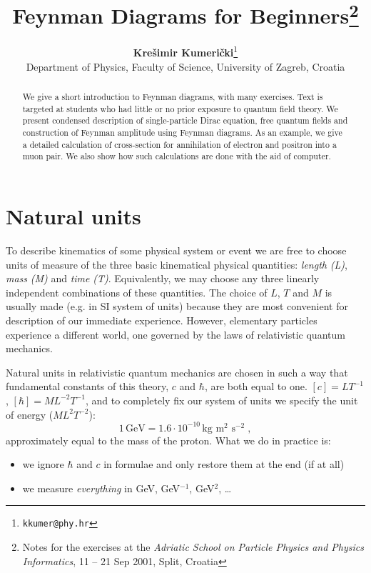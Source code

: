 \documentclass[twoside,a4paper,12pt]{article}
\theoremstyle{break}
\theoremstyle{plain}
\begin{document}

\title{ \Huge \textbf{Feynman Diagrams for Beginners}\footnote{%
Notes for the exercises at the
\emph{Adriatic School on Particle Physics and Physics Informatics},
11 -- 21 Sep 2001, Split, Croatia}
}

\author{\textbf{Krešimir Kumerički}\footnote{\scriptsize\texttt{kkumer@phy.hr}}\\[2ex]
\small Department of Physics, Faculty of Science, University of Zagreb, Croatia}
\date{}
\maketitle

\begin{abstract}                              
  We give a short introduction to Feynman diagrams, with many exercises.
  Text is targeted at students who had little or no prior exposure to
  quantum field theory. We present condensed description of single-particle 
  Dirac equation,
  free quantum fields and construction of Feynman amplitude using
  Feynman diagrams. As an example, we give a detailed calculation of
  cross-section for annihilation of electron and positron into a muon pair.
  We also show how such calculations are done with the aid of computer.
\end{abstract}      

\tableofcontents

\section{Natural units}

To describe kinematics of some physical system or event we are free to choose
units of measure of the three basic kinematical physical
quantities: \emph{length} \emph{(L)}, \emph{mass} \emph{(M)} and
\emph{time} \emph{(T)}. Equivalently, we may choose any three linearly
independent combinations of these quantities.
The choice of $L$, $T$ and $M$ is usually made (e.g. in SI system of
units) because they are most convenient for description of our immediate
experience. However, elementary particles experience a different world,
one governed by the laws of relativistic quantum mechanics.

Natural units in relativistic quantum mechanics are chosen in such a
way that
fundamental constants of this theory, $c$ and $\hbar$, are both equal to one.
$[c]=LT^{-1}$, $[\hbar]=ML^{-2}T^{-1}$, and to completely fix our system
of units we specify the unit of energy ($ML^2T^{-2}$):
\[
  1\,\mbox{GeV} = 1.6\cdot 10^{-10}\,\mbox{kg m$^2$ s$^{-2}$} \;,
\]
approximately equal to the mass of the proton.
What we do in practice is:
\begin{itemize}
\item we ignore $\hbar$ and $c$ in  formulae and only restore them at the
  end (if at all)
\item we measure \emph{everything} in GeV, GeV$^{-1}$, GeV$^2$, \ldots
\end{itemize}
\end{document}
